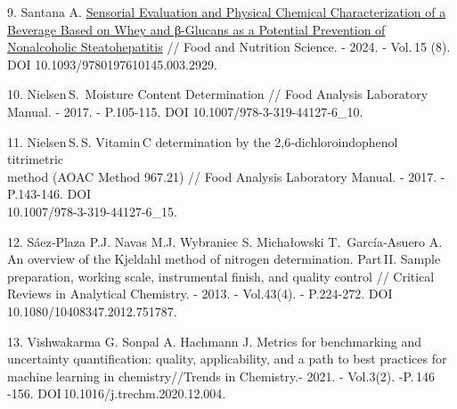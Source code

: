 \begin{references}
9. Santana A.
\href{https://www.scirp.org/journal/paperinformation?paperid=135551}{Sensorial
Evaluation and Physical Chemical Characterization of a Beverage Based on
Whey and β-Glucans as a Potential Prevention of Nonalcoholic
Steatohepatitis} // Food and Nutrition Science. - 2024. - Vol.\,15 (8).
DOI 10.1093/9780197610145.003.2929.

10. Nielsen\,S.\, Moisture Content Determination // Food Analysis
Laboratory Manual. - 2017. - P.105-115. DOI
10.1007/978-3-319-44127-6\_10.

11. Nielsen\,S.\,S. Vitamin\,C determination by the
2,6‑dichloroindophenol titrimetric \\method (AOAC Method 967.21) // Food
Analysis Laboratory Manual. - 2017. - P.143-146. DOI\\
10.1007/978-3-319-44127-6\_15.

12. Sáez‑Plaza P.J. Navas M.J. Wybraniec S. Michałowski T.
\,García‑Asuero A. An overview of the Kjeldahl method of nitrogen
determination. Part\,II. Sample preparation, working scale, instrumental
finish, and quality control // Critical Reviews in Analytical Chemistry.
- 2013. - Vol.43(4). - P.224-272. DOI 10.1080/10408347.2012.751787.

13. Vishwakarma G. Sonpal A. Hachmann J. Metrics for benchmarking and
uncertainty quantification: quality, applicability, and a path to best
practices for machine learning in chemistry//Trends in Chemistry.- 2021.
- Vol.3(2). -P.\,146 -156. DOI\,10.1016/j.trechm.2020.12.004.
\end{references}

